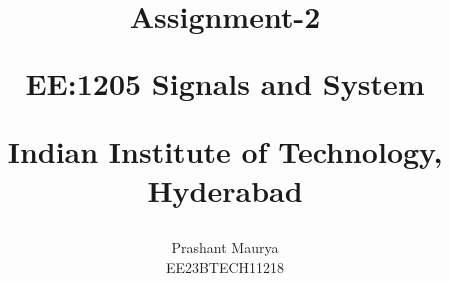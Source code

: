 \documentclass[journal,12pt,twocolumn]{IEEEtran}
\theoremstyle{remark}
\begin{document}
%




\vspace{3cm}

\title{
Assignment-2 

\large{EE:1205 Signals and System}

Indian Institute of Technology, Hyderabad
}
\author{Prashant Maurya

EE23BTECH11218
}	


%
%
%

% 
%



% 
\end{document}

